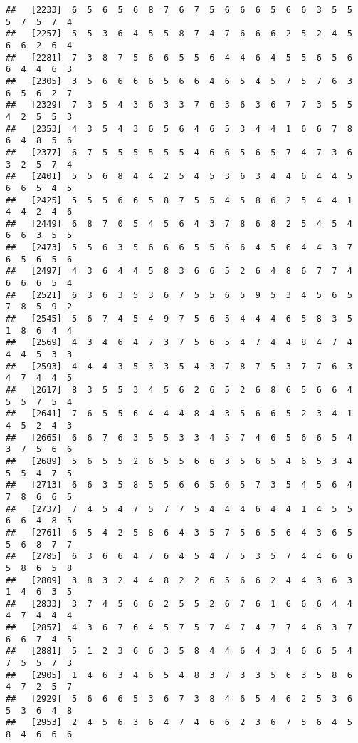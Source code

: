 \documentclass[
]{book}
\begin{document}
\begin{verbatim}
##   [2233]  6  5  6  5  6  8  7  6  7  5  6  6  6  5  6  6  3  5  5  5  7  5  7  4
##   [2257]  5  5  3  6  4  5  5  8  7  4  7  6  6  6  2  5  2  4  5  6  6  2  6  4
##   [2281]  7  3  8  7  5  6  6  5  5  6  4  4  6  4  5  5  6  5  6  6  4  4  6  3
##   [2305]  3  5  6  6  6  6  5  6  6  4  6  5  4  5  7  5  7  6  3  6  5  6  2  7
##   [2329]  7  3  5  4  3  6  3  3  7  6  3  6  3  6  7  7  3  5  5  4  2  5  5  3
##   [2353]  4  3  5  4  3  6  5  6  4  6  5  3  4  4  1  6  6  7  8  6  4  8  5  6
##   [2377]  6  7  5  5  5  5  5  5  4  6  6  5  6  5  7  4  7  3  6  3  2  5  7  4
##   [2401]  5  5  6  8  4  4  2  5  4  5  3  6  3  4  4  6  4  4  5  6  6  5  4  5
##   [2425]  5  5  5  6  6  5  8  7  5  5  4  5  8  6  2  5  4  4  1  4  4  2  4  6
##   [2449]  6  8  7  0  5  4  5  6  4  3  7  8  6  8  2  5  4  5  4  6  6  3  5  5
##   [2473]  5  5  6  3  5  6  6  6  5  5  6  6  4  5  6  4  4  3  7  6  5  6  5  6
##   [2497]  4  3  6  4  4  5  8  3  6  6  5  2  6  4  8  6  7  7  4  6  6  6  5  4
##   [2521]  6  3  6  3  5  3  6  7  5  5  6  5  9  5  3  4  5  6  5  7  8  5  9  2
##   [2545]  5  6  7  4  5  4  9  7  5  6  5  4  4  4  6  5  8  3  5  1  8  6  4  4
##   [2569]  4  3  4  6  4  7  3  7  5  6  5  4  7  4  4  8  4  7  4  4  4  5  3  3
##   [2593]  4  4  4  3  5  3  3  5  4  3  7  8  7  5  3  7  7  6  3  4  7  4  4  5
##   [2617]  8  3  5  5  3  4  5  6  2  6  5  2  6  8  6  5  6  6  4  5  5  7  5  4
##   [2641]  7  6  5  5  6  4  4  4  8  4  3  5  6  6  5  2  3  4  1  4  5  2  4  3
##   [2665]  6  6  7  6  3  5  5  3  3  4  5  7  4  6  5  6  6  5  4  3  7  5  6  6
##   [2689]  5  6  5  5  2  6  5  5  6  6  3  5  6  5  4  6  5  3  4  5  5  4  7  5
##   [2713]  6  6  3  5  8  5  5  6  6  5  6  5  7  3  5  4  5  6  4  7  8  6  6  5
##   [2737]  7  4  5  4  7  5  7  7  5  4  4  4  6  4  4  1  4  5  5  6  6  4  8  5
##   [2761]  6  5  4  2  5  8  6  4  3  5  7  5  6  5  6  4  3  6  5  5  6  8  7  7
##   [2785]  6  3  6  6  4  7  6  4  5  4  7  5  3  5  7  4  4  6  6  5  8  6  5  8
##   [2809]  3  8  3  2  4  4  8  2  2  6  5  6  6  2  4  4  3  6  3  1  4  6  3  5
##   [2833]  3  7  4  5  6  6  2  5  5  2  6  7  6  1  6  6  6  4  4  4  7  4  4  4
##   [2857]  4  3  6  7  6  4  5  7  5  7  4  7  4  7  7  4  6  3  7  6  6  7  4  5
##   [2881]  5  1  2  3  6  6  3  5  8  4  4  6  4  3  4  6  6  5  4  7  5  5  7  3
##   [2905]  1  4  6  3  4  6  5  4  8  3  7  3  3  5  6  3  5  8  6  4  7  2  5  7
##   [2929]  5  6  6  6  5  3  6  7  3  8  4  6  5  4  6  2  5  3  6  5  3  6  4  8
##   [2953]  2  4  5  6  3  6  4  7  4  6  6  2  3  6  7  5  6  4  5  8  4  6  6  6

\end{verbatim}
\end{document}

